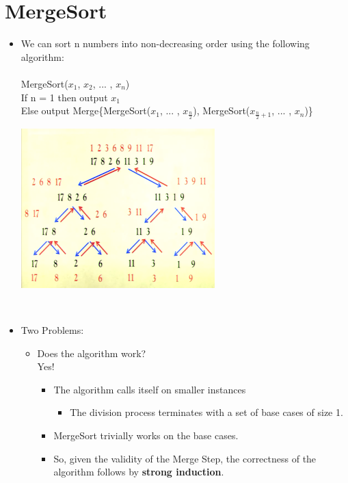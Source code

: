 \documentclass[12pt]{article}
\begin{document}
\section{MergeSort}
\renewcommand{\labelitemii}{$\circ$}
\renewcommand{\labelitemiii}{$\cdot$}
\renewcommand{\labelitemiii}{$\rightarrow$}
\begin{itemize}
\item We can sort n numbers into non-decreasing order using the following algorithm:\\
\\
{\large
\noindent MergeSort($x_1$, $x_2$, ... , $x_n$)\\
\noindent If n = 1 then output $x_1$\\
\noindent Else output Merge\{MergeSort($x_1$, ... , $x_{\frac{n}{2}}$), MergeSort($x_{\frac{n}{2} + 			1}$, ... , $x_n$)\} }\\
	\begin{center}
	\includegraphics{lecture2a}
	\end{center} ~\newline
\item Two Problems:
	\begin{itemize}
	\item Does the algorithm work?\\
	\noindent Yes!
		\begin{itemize}
		\item The algorithm calls itself on smaller instances
			\begin{itemize}
			\item The division process terminates with a set of base cases of size 1.
			\end{itemize}
		\item MergeSort trivially works on the base cases. 
		\item So, given the validity of the Merge Step, the correctness of the algorithm follows by 				\textbf{strong induction}.
			\begin{itemize}

\end{itemize}
\end{itemize}
\end{itemize}
\end{itemize}
\end{document}
